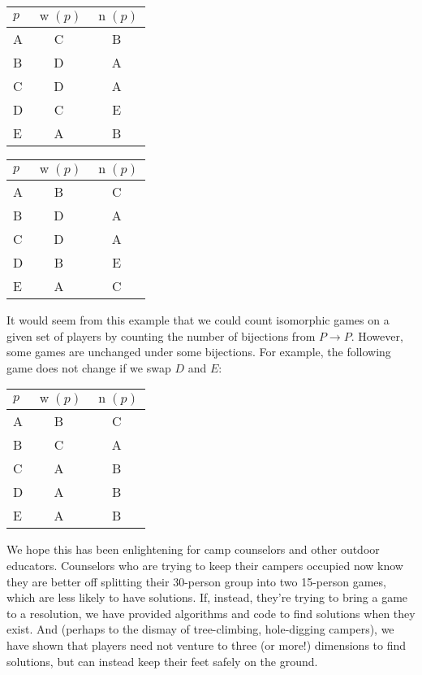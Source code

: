 \documentclass[12pt,x11names, rgb]{article}
\DeclareMathOperator{\w}{w}
\DeclareMathOperator{\n}{n}
\begin{document}
    \begin{center}
    \begin{multicols}{2}
        \begin{tabular}{l | c | c}
             $p$ & $\w(p)$ & $\n(p)$ \\
             \hline
             A &  C& B\\
             B &  D& A\\
             C &  D& A\\
             D &  C& E\\
             E &  A& B\\
        \end{tabular}


        \columnbreak
        \begin{tabular}{l | c | c}
             $p$ & $\w(p)$ & $\n(p)$ \\
             \hline
             A &  B& C\\
             B &  D& A\\
             C &  D& A\\
             D &  B& E\\
             E &  A& C\\
        \end{tabular}
    \end{multicols}
    \end{center}

    It would seem from this example that we could count isomorphic games on a given set of players by counting the number of bijections from $P\to P$. However, some games are unchanged under some bijections. For example, the following game does not change if we swap $D$ and $E$:

    \begin{center}
        \begin{tabular}{l | c | c}
             $p$ & $\w(p)$ & $\n(p)$ \\
             \hline
             A &  B& C\\
             B &  C& A\\
             C &  A& B\\
             D &  A& B\\
             E &  A& B\\
        \end{tabular}
    \end{center}

We hope this has been enlightening for camp counselors and other outdoor educators. Counselors who are trying to keep their campers occupied now know they are better off splitting their 30-person group into two 15-person games, which are less likely to have solutions. If, instead, they're trying to bring a game to a resolution, we have provided algorithms and code to find solutions when they exist. And (perhaps to the dismay of tree-climbing, hole-digging campers), we have shown that players need not venture to three (or more!) dimensions to find solutions, but can instead keep their feet safely on the ground. 
\end{document}

